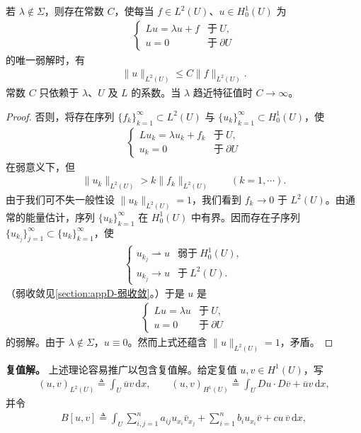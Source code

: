 \documentclass[../../main.tex]{subfiles}
\begin{document}
\begin{theorem}[逆的有界性]\label{theorem:ch06-逆有界}若 $\lambda\notin\Sigma$，则存在常数 $C$，使每当 $f\in L^{2}(U)$、$u\in H^{1}_{0}(U)$ 为
\begin{align*}
\begin{cases}
Lu=\lambda u+f & \text{于}\ U,\\
u=0 & \text{于}\ \partial U
\end{cases}
\end{align*}
的唯一弱解时，有
\begin{align}
\|u\|_{L^{2}(U)}\leqslant C\|f\|_{L^{2}(U)}.
\end{align}
常数 $C$ 只依赖于 $\lambda$、$U$ 及 $L$ 的系数。当 $\lambda$ 趋近特征值时 $C\to\infty$。
\end{theorem}

\begin{proof}
否则，将存在序列 $\{f_{k}\}_{k=1}^{\infty}\subset L^{2}(U)$ 与 $\{u_{k}\}_{k=1}^{\infty}\subset H^{1}_{0}(U)$，使
\begin{align*}
\begin{cases}
Lu_{k}=\lambda u_{k}+f_{k} & \text{于}\ U,\\
u_{k}=0 & \text{于}\ \partial U
\end{cases}
\end{align*}
在弱意义下，但
\begin{align*}
\|u_{k}\|_{L^{2}(U)}>k\|f_{k}\|_{L^{2}(U)}\qquad (k=1,\cdots).
\end{align*}
由于我们可不失一般性设 $\|u_{k}\|_{L^{2}(U)}=1$，我们看到 $f_{k}\to 0$ 于 $L^{2}(U)$。由通常的能量估计，序列 $\{u_{k}\}_{k=1}^{\infty}$ 在 $H^{1}_{0}(U)$ 中有界。因而存在子序列 $\{u_{k_{j}}\}_{j=1}^{\infty}\subset\{u_{k}\}_{k=1}^{\infty}$，使
\begin{align}
\begin{cases}
u_{k_{j}}\rightharpoonup u & \text{弱于}\ H^{1}_{0}(U),\\
u_{k_{j}}\to u & \text{于}\ L^{2}(U).
\end{cases}
\end{align}
（弱收敛见\cref{section:appD-弱收敛}。）于是 $u$ 是
\begin{align*}
\begin{cases}
Lu=\lambda u & \text{于}\ U,\\
u=0 & \text{于}\ \partial U
\end{cases}
\end{align*}
的弱解。由于 $\lambda\notin\Sigma$，$u\equiv 0$。然而上式还蕴含 $\|u\|_{L^{2}(U)}=1$，矛盾。
\end{proof}

\textbf{复值解。} 上述理论容易推广以包含复值解。给定复值 $u,v\in H^{1}(U)$，写
\begin{align*}
(u,v)_{L^{2}(U)}\triangleq\int_{U}\overline{u}v\,\mathrm{d}x,\qquad
(u,v)_{H^{1}(U)}\triangleq\int_{U}Du\cdot D\overline{v}+\overline{u}v\,\mathrm{d}x,
\end{align*}
并令
\begin{align*}
B[u,v]\triangleq\int_{U}\sum_{i,j=1}^{n}a_{ij}u_{x_{i}}\overline{v}_{x_{j}}+\sum_{i=1}^{n}b_{i}u_{x_{i}}\overline{v}+cu\,\overline{v}\,\mathrm{d}x,
\end{align*}
\end{document}
